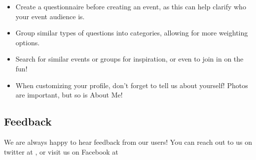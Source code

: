 \begin{itemize}
\item Create a questionnaire before creating an event, as this can help clarify who your event audience is.
\item Group similar types of questions into categories, allowing for more weighting options.
\item Search for similar events or groups for inspiration, or even to join in on the fun!
\item When customizing your profile, don't forget to tell us about yourself! Photos are important, but so is About Me!
\end{itemize}

\subsection{Feedback}
\label{sec:feedback}

We are always happy to hear feedback from our users! You can reach out to us on twitter at , or visit us on Facebook at 
